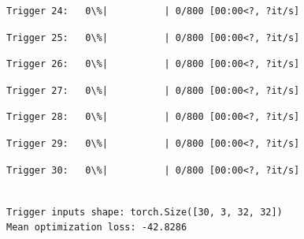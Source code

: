 \documentclass[11pt]{article}
\begin{document}
    
    
    \begin{Verbatim}[commandchars=\\\{\}]
Trigger 24:   0\%|          | 0/800 [00:00<?, ?it/s]
    \end{Verbatim}

    
    
    \begin{Verbatim}[commandchars=\\\{\}]
Trigger 25:   0\%|          | 0/800 [00:00<?, ?it/s]
    \end{Verbatim}

    
    
    \begin{Verbatim}[commandchars=\\\{\}]
Trigger 26:   0\%|          | 0/800 [00:00<?, ?it/s]
    \end{Verbatim}

    
    
    \begin{Verbatim}[commandchars=\\\{\}]
Trigger 27:   0\%|          | 0/800 [00:00<?, ?it/s]
    \end{Verbatim}

    
    
    \begin{Verbatim}[commandchars=\\\{\}]
Trigger 28:   0\%|          | 0/800 [00:00<?, ?it/s]
    \end{Verbatim}

    
    
    \begin{Verbatim}[commandchars=\\\{\}]
Trigger 29:   0\%|          | 0/800 [00:00<?, ?it/s]
    \end{Verbatim}

    
    
    \begin{Verbatim}[commandchars=\\\{\}]
Trigger 30:   0\%|          | 0/800 [00:00<?, ?it/s]
    \end{Verbatim}

    
    \begin{Verbatim}[commandchars=\\\{\}]

Trigger inputs shape: torch.Size([30, 3, 32, 32])
Mean optimization loss: -42.8286
    \end{Verbatim}
\end{document}
